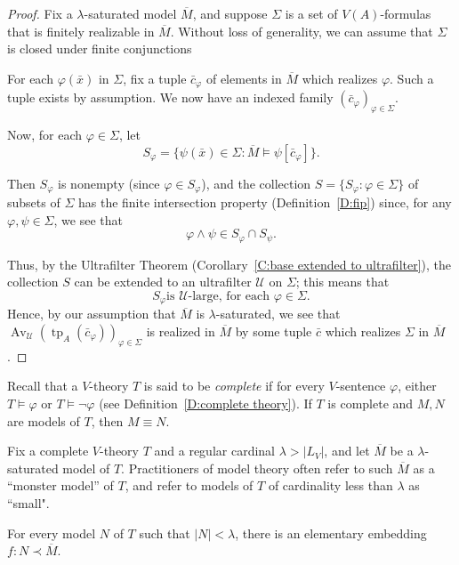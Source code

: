 \documentclass{scrartcl}
\DeclareMathOperator{\Av}{Av }
\DeclareMathOperator{\tp}{tp}
\renewcommand{\phi}{\varphi}
\newcommand{\SU}{\mathscr{U}}
\begin{document}
\begin{proof}
Fix a $\lambda$-saturated model $\overline{M}$, and suppose $\Sigma$ is a set of $V(A)$-formulas that is finitely realizable in $\overline{M}$. Without loss of generality, we can assume that $\Sigma$ is closed under finite conjunctions

For each $\phi(\bar{x})$ in $\Sigma$, fix a tuple $\bar{c}_\phi$ of elements in $\overline{M}$ which realizes $\phi$. Such a tuple exists by assumption. We now have an indexed family $(\bar{c}_\phi)_{\phi\in \Sigma}$.

Now, for each $\phi\in \Sigma$, let
\[
S_\phi = 
\{ \psi(\bar{x})\in \Sigma \colon \overline{M} \models \psi [\bar{c}_\phi] \}.
\]

Then $S_\phi$ is nonempty (since $\phi \in S_\phi$), and
the collection $S = \{S_\phi \colon \phi \in \Sigma\}$ of subsets of $\Sigma$ has the finite intersection property (Definition~\ref{D:fip}) since, for any $\phi,\psi\in \Sigma$, we see that 
\[
\phi\wedge\psi\in S_\phi\cap S_\psi.
\]

Thus, by the Ultrafilter Theorem (Corollary~\ref{C:base extended to ultrafilter}), the collection $S$ can be extended to an ultrafilter $\mathscr{U}$ on $\Sigma$; this means that
\[
\text{$S_\phi$
is $\mathscr{U}$-large, for each $\phi\in \Sigma$}.
\]
Hence, by our assumption that $\overline{M}$ is $\lambda$-saturated, we see that $\Av_\SU (\tp_A (\bar{c}_\phi))_{\phi\in\Sigma}$ is realized in $\overline{M}$ by some tuple $\bar{c}$ which realizes $\Sigma$ in $\overline{M}$.
\end{proof}


Recall that a $V$-theory $T$ is said to be \emph{complete} if for every $V$-sentence $\phi$, either $T\models \phi$ or $T\models \neg\phi$
(see Definition~\ref{D:complete theory}). If $T$ is complete and $M,N$ are models of $T$, then $M\equiv N$.


Fix a complete $V$-theory $T$ and a regular cardinal $\lambda > |L_V|$, and let $\overline{M}$ be a $\lambda$-saturated model of $T$. Practitioners of model theory often refer to such $\overline{M}$ as a ``monster model'' of $T$, and refer to models of $T$ of cardinality less than $\lambda$ as ``small".

\begin{corollary}
For every model $N$ of $T$ such that $|N|<\lambda$, there is an elementary embedding $f\colon N\prec \overline{M}$.

\end{corollary}
\end{document}

